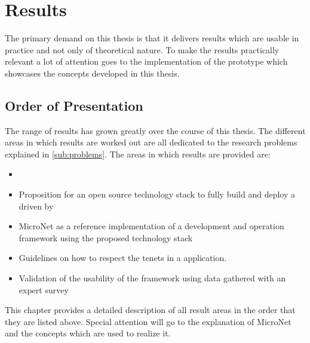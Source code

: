 \chapter{Results}

The primary demand on this thesis is that it delivers results which are
usable in practice and not only of theoretical nature. To make the results
practically relevant a lot of attention goes to the implementation of the
prototype which showcases the concepts developed in this thesis.

\section{Order of Presentation}

The range of results has grown greatly over the course of this thesis. The
different areas in which results are worked out are all dedicated to the
research problems explained in \autoref{sub:problems}. The areas in which
results are provided are:

\begin{itemize}
  \item \item Proposition for an  open source technology stack to fully build and
  deploy a \og{} driven by \mss{}
  \item MicroNet as a reference implementation of a \ms{} \og{} development and
  operation framework using the proposed technology stack
  \item Guidelines on how to respect the \ms{} tenets in a \og{} \ms{}
  application.
  \item Validation of the usability of the framework using data gathered with an
  expert survey 
\end{itemize}

This chapter provides a detailed description of all result areas in the order
that they are listed above. Special attention will go to the explanation of
MicroNet and the concepts which are used to realize it.

\newpage

\newpage

\newpage

\newpage
